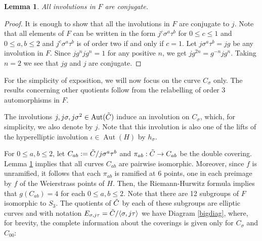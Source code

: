 \documentclass{amsart}
\newtheorem{lem}[thm]{Lemma}
\theoremstyle{remark}
\numberwithin{equation}{section}
\newcommand{\tC}{\Tilde{C}}
\newcommand{\s}{\sigma}
\DeclareMathOperator{\Aut}{Aut}
\begin{document}
\begin{lem}
\label{conj}
All involutions in $F$ are conjugate.
\end{lem}
\begin{proof}

    It is enough to show that all the involutions in $F$ are conjugate to $j$. Note that all elements of $F$ can be written in the form $j^c\sigma^a\tau^b$ for $0 \leq c \leq 1$ and $0 \leq a,b \leq 2$ and $j^c\sigma^a\tau^b$ is of order two if and only if $c = 1$. Let $j\sigma^a\tau^b = jg$ be any involution in $F$. Since $jg^njg^n = 1$ for any positive $n$, we get $jg^{2n} = g^{-n}jg^{n}$. Taking $n= 2$ we see that $jg$ and $j$ are conjugate.
    
\end{proof}

For the simplicity of exposition, we will now focus on the curve $C_\s$ only. The results concerning other quotients follow from the relabelling of order 3 automorphisms in $F$. 

The involutions $j, j\sigma, j\sigma^2\in \Aut(\tC)$ induce an involution on $C_{\sigma}$, which, for simplicity, we also denote by $j$. Note that this involution is also one of the lifts of the hyperelliptic involution $\iota\in \Aut(H)$ by $h_{\sigma}$. 

For $0 \leq a,b \leq 2$, let $C_{ab} := \Tilde{C}/j\sigma^a\tau^b$ and $\pi_{ab}: \Tilde{C} \to C_{ab}$ be the double covering. Lemma \ref{conj} implies that all curves $C_{ab}$ are pairwise isomorphic. Moreover, since \(f\) is unramified, it follows that  each $\pi_{ab}$ is ramified at 6 points, one in each preimage by $f$ of the Weierstrass points of $H$. Then, the Riemann-Hurwitz formula implies that $g(C_{ab}) = 4$ for each $0 \leq a,b \leq 2$. Note that there are 12 subgroups of $F$ isomorphic to $S_{3}$. The quotients of $\tC$ by each of these subgroups are elliptic curves and with notation $E_{\sigma, j\tau} = \tC /\langle \sigma, j\tau \rangle$ we have Diagram \ref{bigdiag}, where, for brevity, the complete information about the coverings is given only for $C_{\sigma}$ and $C_{00}$:
\end{document}
